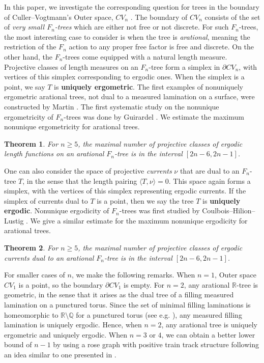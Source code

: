 \documentclass[11pt, letterpaper]{amsart}
\theoremstyle{plain}
\newtheorem{MAINTHM}{Theorem}
\theoremstyle{definition}
\newcommand{\R}{\mathbb{R}}
\newcommand{\Q}{\mathbb{Q}}
\begin{document}
In this paper, we investigate the corresponding question for trees in the
boundary of Culler--Vogtmann's Outer space, $CV_n$ \cite{culler1986moduli}. The
boundary of $CV_n$ consists of the set of \textit{very small $F_n$-trees} which
are either not free or not discrete. 
For such $F_n$-trees, the most interesting case to
consider is when the tree is \textit{arational}, meaning the restriction of the
$F_n$ action to any proper free factor is free and discrete. On the other hand,
the $F_n$-trees come equipped with a natural length measure.
Projective classes of length measures on an $F_n$-tree form a simplex in
$\partial CV_n$, with vertices of this simplex corresponding to ergodic ones.
When the simplex is a point, we say $T$ is \textbf{uniquely ergometric}.
The first examples of nonuniquely ergometric arational trees, not dual to a
measured lamination on a surface, were constructed by Martin \cite{martin1997nonuniquely}.
The first systematic study on the nonunique ergometricity of $F_n$-trees
was done by Guirardel \cite[Corollary 5.4]{guirardel2000dynamics}.
We estimate the maximum nonunique ergometricity for arational trees.
\begin{MAINTHM}\label{thm:main}
  For $n \ge 5$, the maximal number of projective classes of ergodic length functions
  on an arational $F_n$-tree is in the interval $[2n-6,2n-1]$.
\end{MAINTHM}

One can also consider the space of projective \emph{currents} $\nu$ that are dual to an
$F_n$-tree $T$, in the sense that the length pairing $\langle T,
\nu \rangle = 0$. This space again forms a simplex, with the vertices of this simplex
representing ergodic currents. If the simplex of currents dual to $T$ is a point, then we say the
tree $T$ is \textbf{uniquely ergodic}. Nonunique ergodicity of $F_n$-trees was
first studied by Coulbois--Hilion--Lustig \cite[Section 7]{CHL2008RtreeII}. We give a similar estimate for the
maximum nonunique ergodicity for arational trees.
\begin{MAINTHM}\label{thm:main_current}
  For $n \ge 5$,
  the maximal number of projective classes of ergodic
  currents dual to an arational $F_n$-tree is in the interval
  $[2n-6,2n-1]$. 
\end{MAINTHM}

For smaller cases of $n$, we make the following remarks. When $n=1$, Outer space $CV_1$ is a
point, so the boundary $\partial CV_1$ is empty. For $n=2$,
any arational $\R$-tree is geometric, in the sense that it arises as the dual
tree of a filling measured lamination on a punctured torus. Since the set of
minimal filling laminations is homeomorphic to $\R \setminus \Q$ for a punctured
torus (see e.g. \cite{gabai2014topology}), any measured filling lamination is
uniquely ergodic. Hence, when $n=2$, any arational tree is uniquely ergometric
and uniquely ergodic.  When $n=3$ or $4$, we can obtain a better lower bound of $n-1$ by using a rose graph with positive train track structure following an idea similar to one presented in .
\end{document}
